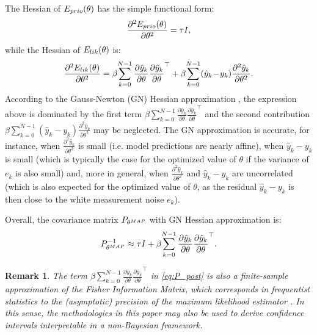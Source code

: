 \documentclass{ifacconf}
\newcommand{\nsamp}{N}
\newcommand{\MAP}{{\rm MAP}}
\newcommand{\mean}[1]{\hat{#1}}
\newtheorem{remark}{Remark}%
\begin{document}
The Hessian of $E_{\rm prio}(\theta)$ has the simple functional form:
\begin{equation}
 \frac{\partial^2 E_{\rm prio}(\theta)}{\partial \theta^2} 
 = \tau I,
\end{equation}
while the Hessian of $E_{\rm lik}(\theta)$ is:
\begin{equation}
\label{eq:full_hessian}
\frac{\partial^2 E_{\rm lik}(\theta)}{\partial \theta^2}
=  \beta \!\sum_{k=0}^{\nsamp-1} \frac{\partial \mean{y}_k}{\partial \theta} {\frac{\partial \mean{y}_k}{\partial \theta}}^{\top} +%
\beta \!\sum_{k=0}^{\nsamp-1} (\mean{y}_k\! -\! y_k) \frac{\partial^2 \mean{y}_k}{\partial \theta^2}.
\end{equation}
According to the  Gauss-Newton (GN) Hessian approximation \citep{wright1999numerical}, the expression above  is dominated by the first term $\beta \!\sum_{k=0}^{\nsamp-1} \frac{\partial \mean{y}_k}{\partial \theta} {\frac{\partial \mean{y}_k}{\partial \theta}}^{\top}$ and the second contribution $\beta \sum_{k=0}^{\nsamp-1} (\mean{y}_k - y_k) \frac{\partial^2 \mean{y}_k}{\partial \theta^2}$ may be neglected.  The GN approximation is accurate, for instance, when $\frac{\partial^2 \mean{y}_k}{\partial \theta^2}$ is small (i.e. model predictions are nearly affine), when $\mean{y}_k - y_k$ is small (which is typically the case for the optimized value of $\theta$ if the variance of $e_k$ 
is also small) and, more in general, when $\frac{\partial^2 \mean{y}_k}{\partial \theta^2}$ and $\mean{y}_k - y_k$ are uncorrelated (which is also expected
for the optimized value of $\theta$, as the residual $\mean{y}_k - y_k$ is then close to the white measurement noise $e_k$).


Overall, the covariance matrix $P_{\theta^{\MAP}}$ with GN Hessian approximation is:
\begin{equation}
\label{eq:P_post}
P_{\theta^{\rm MAP}}^{-1} \approx \tau I + \beta \!\sum_{k=0}^{\nsamp-1} \frac{\partial \mean{y}_k}{\partial \theta} {\frac{\partial \mean{y}_k}{\partial \theta}}^\top.
\end{equation}


\begin{remark}
The term $\beta \!\sum_{k=0}^{\nsamp-1} \frac{\partial \mean{y}_k}{\partial \theta} {\frac{\partial \mean{y}_k}{\partial \theta}}^\top$ in \eqref{eq:P_post} is also a finite-sample approximation of the \emph{Fisher Information Matrix}, which corresponds in frequentist statistics to the (asymptotic) precision of the maximum likelihood estimator \citep{van2007parameter}. In this sense, the methodologies in this paper may also be used to derive confidence intervals interpretable in a non-Bayesian framework.
\end{remark}
\end{document}
